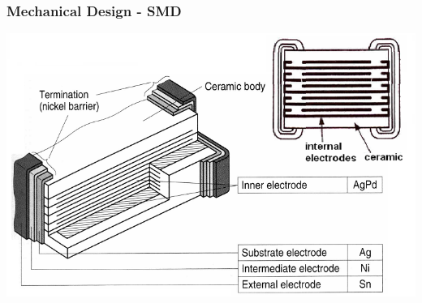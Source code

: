 \documentclass{beamer}
\begin{document}
	\begin{frame}
    \frametitle{Mechanical Design - SMD}
		\begin{center}
			\includegraphics[scale=0.45]{obr09_smdKonstrukce.png}
		\end{center}
  \end{frame}
\end{document}
